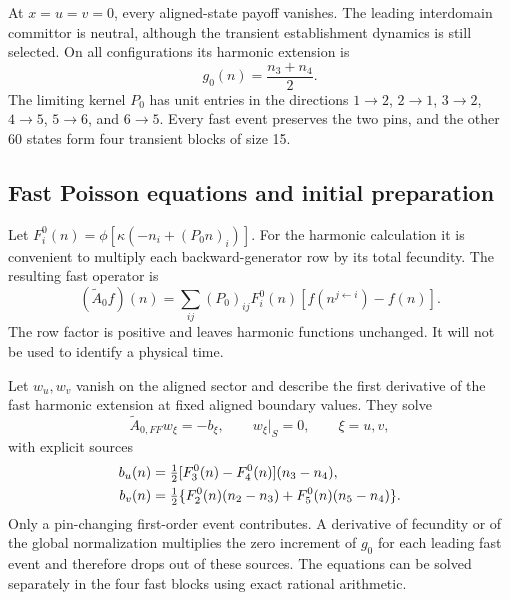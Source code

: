 \documentclass[aps,pre,reprint,amsmath,amssymb,longbibliography]{revtex4-2}
\begin{document}
At \(x=u=v=0\), every aligned-state payoff vanishes.
The leading interdomain committor is neutral, although
the transient establishment dynamics is still selected.
On all configurations its harmonic extension is
\begin{equation}
 g_0(n)=\frac{n_3+n_4}{2}.
 \label{eq:app-boundary-gzero-v2}
\end{equation}
The limiting kernel \(P_0\) has unit entries in the
directions \(1\to2\), \(2\to1\), \(3\to2\),
\(4\to5\), \(5\to6\), and \(6\to5\).
Every fast event preserves the two pins, and the
other 60 states form four transient blocks of
size 15.

\subsection{Fast Poisson equations and initial preparation}

Let \(F_i^0(n)=\phi[\kappa(-n_i+(P_0n)_i)]\).
For the harmonic calculation it is convenient to
multiply each backward-generator row by its total
fecundity. The resulting fast operator is
\begin{equation}
 (\widetilde A_0 f)(n)=
 \sum_{ij}(P_0)_{ij}F_i^0(n)
       [f(n^{j\leftarrow i})-f(n)].
 \label{eq:app-boundary-rescaled-generator-v2}
\end{equation}
The row factor is positive and leaves harmonic
functions unchanged. It will not be used to
identify a physical time.

Let \(w_u,w_v\) vanish on the aligned sector and
describe the first derivative of the fast harmonic
extension at fixed aligned boundary values.
They solve
\begin{equation}
 \widetilde A_{0,FF}w_\xi=-b_\xi,\qquad
 w_\xi|_S=0,\qquad \xi=u,v,
 \label{eq:app-boundary-fast-poisson-v2}
\end{equation}
with explicit sources
\begin{align}
 b_u(n)&=\tfrac12[F_3^0(n)-F_4^0(n)](n_3-n_4),\notag\\
 b_v(n)&=\tfrac12\{F_2^0(n)(n_2-n_3)
                         +F_5^0(n)(n_5-n_4)\}.
 \label{eq:app-boundary-sources-v2}
\end{align}
Only a pin-changing first-order event contributes.
A derivative of fecundity or of the global
normalization multiplies the zero increment of
\(g_0\) for each leading fast event and therefore
drops out of these sources. The equations can
be solved separately in the four fast blocks
using exact rational arithmetic.
\end{document}

